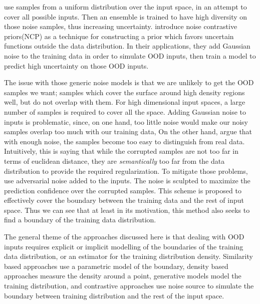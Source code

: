 \documentclass[../main.tex]{subfiles}
\begin{document}
\cite{jain2019maximizing} use samples from a uniform distribution over the input space, in an attempt to cover all possible inputs. Then an ensemble is trained to have high diversity on those noise samples, thus increasing uncertainty. \citet{Hafner2018NoiseCP} introduce noise contrastive priors(NCP) as a technique for constructing a prior which favors uncertain functions outside the data distribution. In their applications, they add Gaussian noise to the training data in order to simulate OOD inputs, then train a model to predict high uncertainty on those OOD inputs.

The issue with those generic noise models is that we are unlikely to get the OOD samples we want; samples which cover the surface around high density regions well, but do not overlap with them. For high dimensional input spaces, a large number of samples is required to cover all the space. Adding Gaussian noise to inputs is problematic, since, on one hand, too little noise would make our noisy samples overlap too much with our training data, On the other hand, \cite{csiszarik2019negative} argue that with enough noise, the samples become too easy to distinguish from real data. Intuitively, this is saying that while the corrupted samples are not too far in terms of euclidean distance, they are \emph{semantically} too far from the data distribution to provide the required regularization. To mitigate those problems, \cite{hein2019relu} use adversarial noise added to the inputs. The noise is sculpted to maximize the prediction confidence over the corrupted samples. This scheme is proposed to effectively cover the boundary between the training data and the rest of input space. Thus we can see that at least in its motivation, this method also seeks to find a boundary of the training data distribution. 


The general theme of the approaches discussed here is that dealing with OOD inputs requires explicit or implicit modelling of the boundaries of the training data distribution, or an estimator for the training distribution density. Similarity based approaches use a parametric model of the boundary, density based approaches measure the density around a point, generative models model the training distribution, and contrastive approaches use noise source to simulate the boundary between training distribution and the rest of the input space.   
\end{document}
